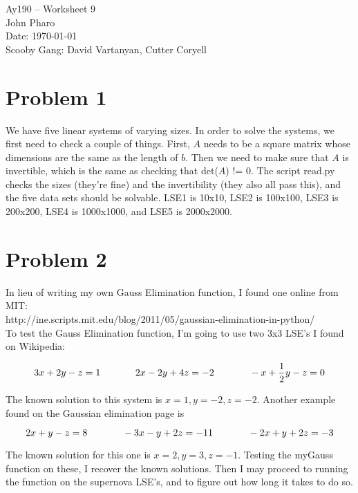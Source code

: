 \documentclass[11pt,letterpaper]{article}
\begin{document}
\begin{center}
\Large
Ay190 -- Worksheet 9\\
John Pharo\\
Date: \today\\
Scooby Gang: David Vartanyan, Cutter Coryell
\end{center}

\section*{Problem 1}

We have five linear systems of varying sizes. In order to solve the systems, we first need to check a couple of things. First, $A$ needs to be a square matrix whose dimensions are the same as the length of $b$. Then we need to make sure that $A$ is invertible, which is the same as checking that det($A$) != 0. The script read.py checks the sizes (they're fine) and the invertibility (they also all pass this), and the five data sets should be solvable. LSE1 is 10x10, LSE2 is 100x100, LSE3 is 200x200, LSE4 is 1000x1000, and LSE5 is 2000x2000.

\section*{Problem 2}

In lieu of writing my own Gauss Elimination function, I found one online from MIT: \\
http://ine.scripts.mit.edu/blog/2011/05/gaussian-elimination-in-python/ \\

To test the Gauss Elimination function, I'm going to use two 3x3 LSE's I found on Wikipedia:

$$ 3x + 2y - z = 1 \hspace*{.5in} 2x - 2y + 4z = -2 \hspace*{.5in} -x + \frac{1}{2}y - z = 0 $$

The known solution to this system is $x=1, y=-2, z=-2$. Another example found on the Gaussian elimination page is

$$ 2x + y - z = 8 \hspace*{.5in} -3x - y + 2z = -11 \hspace*{.5in} -2x + y + 2z = -3 $$

The known solution for this one is $x=2, y=3, z=-1$. Testing the myGauss function on these, I recover the known solutions. Then I may proceed to running the function on the supernova LSE's, and to figure out how long it takes to do so. 
\end{document}
